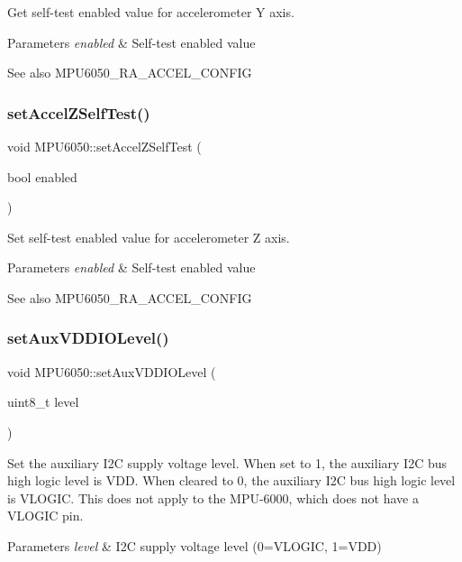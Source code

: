 Get self-\/test enabled value for accelerometer Y axis. 
\begin{DoxyParams}{Parameters}
{\em enabled} & Self-\/test enabled value \\
\hline
\end{DoxyParams}
\begin{DoxySeeAlso}{See also}
M\+P\+U6050\+\_\+\+R\+A\+\_\+\+A\+C\+C\+E\+L\+\_\+\+C\+O\+N\+F\+IG 
\end{DoxySeeAlso}
\mbox{\label{class_m_p_u6050_a8eb8ba039af9a47e0475a3835b87f404}} 
\subsubsection{\texorpdfstring{setAccelZSelfTest()}{setAccelZSelfTest()}}
{\footnotesize\ttfamily void M\+P\+U6050\+::set\+Accel\+Z\+Self\+Test (\begin{DoxyParamCaption}\item[{bool}]{enabled }\end{DoxyParamCaption})}

Set self-\/test enabled value for accelerometer Z axis. 
\begin{DoxyParams}{Parameters}
{\em enabled} & Self-\/test enabled value \\
\hline
\end{DoxyParams}
\begin{DoxySeeAlso}{See also}
M\+P\+U6050\+\_\+\+R\+A\+\_\+\+A\+C\+C\+E\+L\+\_\+\+C\+O\+N\+F\+IG 
\end{DoxySeeAlso}
\mbox{\label{class_m_p_u6050_a7c666c20e26869bc80646f1b2c3d69bc}} 
\subsubsection{\texorpdfstring{setAuxVDDIOLevel()}{setAuxVDDIOLevel()}}
{\footnotesize\ttfamily void M\+P\+U6050\+::set\+Aux\+V\+D\+D\+I\+O\+Level (\begin{DoxyParamCaption}\item[{uint8\+\_\+t}]{level }\end{DoxyParamCaption})}

Set the auxiliary I2C supply voltage level. When set to 1, the auxiliary I2C bus high logic level is V\+DD. When cleared to 0, the auxiliary I2C bus high logic level is V\+L\+O\+G\+IC. This does not apply to the M\+P\+U-\/6000, which does not have a V\+L\+O\+G\+IC pin. 
\begin{DoxyParams}{Parameters}
{\em level} & I2C supply voltage level (0=V\+L\+O\+G\+IC, 1=V\+DD) \\
\hline
\end{DoxyParams}
\mbox{\label{class_m_p_u6050_a71ec4642b6f6c937bbf6a24fea4179e5}} 
